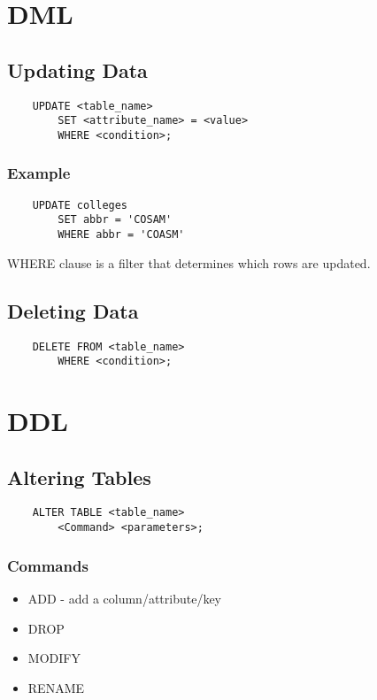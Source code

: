 \documentclass[twoside]{article}
\begin{document}
\newpage
\hfill \break 
{}

\section*{DML}
\subsection*{Updating Data}
\begin{verbatim}
    UPDATE <table_name>
        SET <attribute_name> = <value>
        WHERE <condition>;
\end{verbatim}

\subsubsection*{Example}
\begin{verbatim}
    UPDATE colleges
        SET abbr = 'COSAM'
        WHERE abbr = 'COASM'
\end{verbatim}

WHERE clause is a filter that determines which rows are updated.

\subsection*{Deleting Data}
\begin{verbatim}
    DELETE FROM <table_name>
        WHERE <condition>;
\end{verbatim}

\section*{DDL}
\subsection*{Altering Tables}
\begin{verbatim}
    ALTER TABLE <table_name>
        <Command> <parameters>;
\end{verbatim}
\subsubsection*{Commands}
\begin{itemize}
    \item ADD - add a column/attribute/key
    \item DROP
    \item MODIFY
    \item RENAME
\end{itemize}
\end{document}

